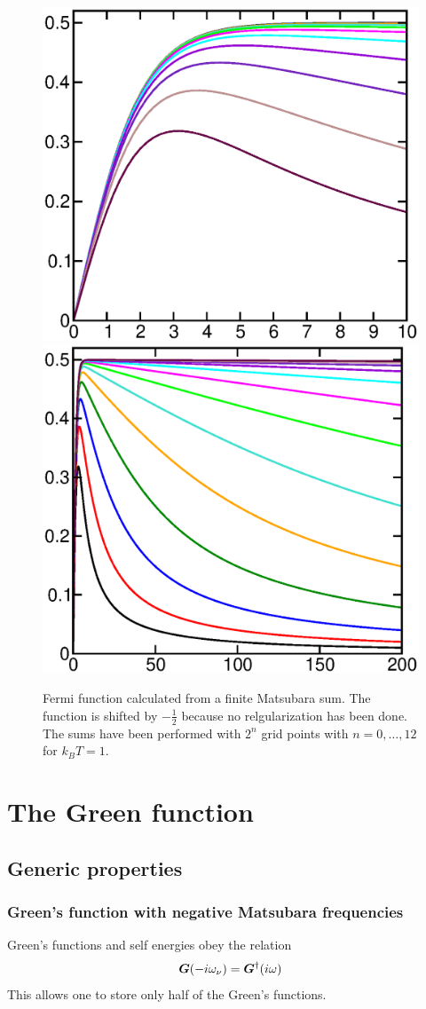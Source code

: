 \documentclass[11pt,a4paper]{report}
\begin{document}
\begin{figure}[h!]
\begin{center}
\includegraphics[width=0.4\linewidth,clip=true]
{Figs/Xmgrace/FiniteMatsubara/gsumlow.eps}
\includegraphics[width=0.4\linewidth,clip=true]
{Figs/Xmgrace/FiniteMatsubara/gsumhigh.eps}
\end{center}
\caption{\label{fig:finfitematsubara} Fermi function calculated from a
  finite Matsubara sum. The function is shifted by $-\frac{1}{2}$
  because no relgularization has been done. The sums have been
  performed with $2^n$ grid points with $n=0,\ldots,12$ for $k_BT=1.$}
\end{figure}



\chapter{The Green function}
\section{Generic properties}
\subsection{Green's function with negative Matsubara frequencies}
Green's functions and self energies obey the relation
\begin{eqnarray}
\bm{G}(-i\omega_\nu)=\bm{G}^\dagger(i\omega)
\label{eq:matsubaragnegfreq}
\end{eqnarray}
This allows one to store only half of the Green's functions.
\end{document}
